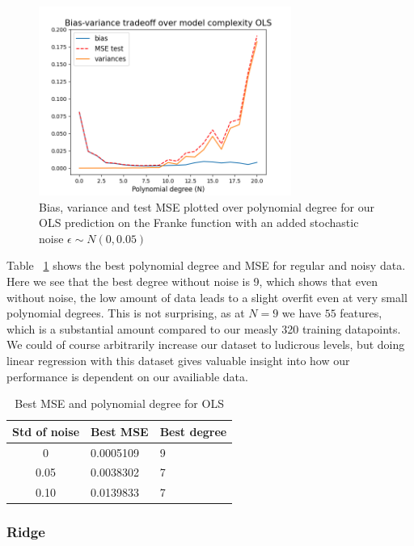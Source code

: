\documentclass[twocolumn,10pt,cleanfoot]{asme2ej}
\begin{document}
\begin{figure}[h]
\centerline{\includegraphics[width=3.25in]{figure/frankiebiasvariance.png}}
\caption{Bias, variance and test MSE plotted over polynomial degree for our OLS prediction on the Franke function with an added stochastic noise $\epsilon \sim N(0,0.05)$}
\label{frankiebiasvariance}
\end{figure}

Table ~\ref{ols_mse_table} shows the best polynomial degree and MSE for regular and noisy data. Here we see that the best degree without noise is 9, which shows that even without noise, the low amount of data leads to a slight overfit even at very small polynomial degrees. This is not surprising, as at $N = 9$ we have $55$ features, which is a substantial amount compared to our measly 320 training datapoints. We could of course arbitrarily increase our dataset to ludicrous levels, but doing linear regression with this dataset gives valuable insight into how our performance is dependent on our availiable data.

\begin{table}[h]
\caption{Best MSE and polynomial degree for OLS}
\begin{center}
\label{ols_mse_table}
\begin{tabular}{c l l}
Std of noise & Best MSE & Best degree \\
\hline
0 & 0.0005109 & 9\\
0.05 & 0.0038302 & 7 \\
0.10 & 0.0139833 & 7 \\
\hline
\end{tabular}
\end{center}
\end{table}

\subsubsection{Ridge}
\end{document}
